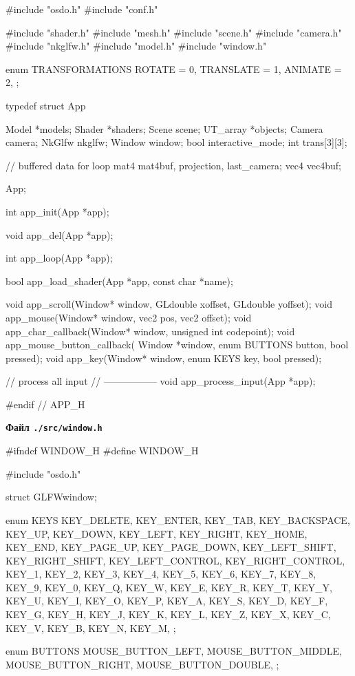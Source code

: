 \begin{multicols}{2}
\begin{ccode}
#include "osdo.h"
#include "conf.h"

#include "shader.h"
#include "mesh.h"
#include "scene.h"
#include "camera.h"
#include "nkglfw.h"
#include "model.h"
#include "window.h"

enum TRANSFORMATIONS {
    ROTATE    = 0,
    TRANSLATE = 1,
    ANIMATE   = 2,
};

typedef struct App {
    Model *models;
    Shader *shaders;
    Scene scene;
    UT_array *objects;
    Camera camera;
    NkGlfw nkglfw;
    Window window;
    bool interactive_mode;
    int trans[3][3];

    // buffered data for loop
    mat4 mat4buf, projection, last_camera;
    vec4 vec4buf;
} App;

int app_init(App *app);

void app_del(App *app);

int app_loop(App *app);

bool app_load_shader(App *app, const char *name);

void app_scroll(Window* window, GLdouble xoffset, GLdouble yoffset);
void app_mouse(Window* window, vec2 pos, vec2 offset);
void app_char_callback(Window* window, unsigned int codepoint);
void app_mouse_button_callback(
        Window *window, enum BUTTONS button, bool pressed);
void app_key(Window* window, enum KEYS key, bool pressed);

// process all input
// -----------------
void app_process_input(App *app);

#endif // APP_H
\end{ccode}
\noindent\cprotect\textbf{Файл \verb+./src/window.h+}
\begin{ccode}
#ifndef WINDOW_H
#define WINDOW_H

#include "osdo.h"

struct GLFWwindow;

enum KEYS {
    KEY_DELETE,
    KEY_ENTER,
    KEY_TAB,
    KEY_BACKSPACE,
    KEY_UP,
    KEY_DOWN,
    KEY_LEFT,
    KEY_RIGHT,
    KEY_HOME,
    KEY_END,
    KEY_PAGE_UP,
    KEY_PAGE_DOWN,
    KEY_LEFT_SHIFT,
    KEY_RIGHT_SHIFT,
    KEY_LEFT_CONTROL,
    KEY_RIGHT_CONTROL,
    KEY_1, KEY_2, KEY_3, KEY_4, KEY_5, KEY_6, KEY_7, KEY_8, KEY_9, KEY_0,
    KEY_Q, KEY_W, KEY_E, KEY_R, KEY_T, KEY_Y, KEY_U, KEY_I, KEY_O, KEY_P,
    KEY_A, KEY_S, KEY_D, KEY_F, KEY_G, KEY_H, KEY_J, KEY_K, KEY_L,
    KEY_Z, KEY_X, KEY_C, KEY_V, KEY_B, KEY_N, KEY_M,
};

enum BUTTONS {
    MOUSE_BUTTON_LEFT,
    MOUSE_BUTTON_MIDDLE,
    MOUSE_BUTTON_RIGHT,
    MOUSE_BUTTON_DOUBLE,
};


\end{ccode}
\end{multicols}
